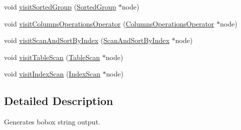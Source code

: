 \begin{DoxyCompactItemize}
void \hyperlink{class_bobox_plan_writing_physical_operator_visitor_a78d8526758ffeb3b335b8fc4a8a2defb}{visit\+Sorted\+Group} (\hyperlink{class_sorted_group}{Sorted\+Group} $\ast$node)
\item 
void \hyperlink{class_bobox_plan_writing_physical_operator_visitor_afe09e3f584a43ff5e06947918cf16a46}{visit\+Columns\+Operations\+Operator} (\hyperlink{class_columns_operations_operator}{Columns\+Operations\+Operator} $\ast$node)
\item 
void \hyperlink{class_bobox_plan_writing_physical_operator_visitor_a09cbea340b85723f8e66e50b466d6e68}{visit\+Scan\+And\+Sort\+By\+Index} (\hyperlink{class_scan_and_sort_by_index}{Scan\+And\+Sort\+By\+Index} $\ast$node)
\item 
void \hyperlink{class_bobox_plan_writing_physical_operator_visitor_aa8d995c39b2364625c1c10b6d7636b23}{visit\+Table\+Scan} (\hyperlink{class_table_scan}{Table\+Scan} $\ast$node)
\item 
void \hyperlink{class_bobox_plan_writing_physical_operator_visitor_ae042371767ff5d9296468da8037efa0f}{visit\+Index\+Scan} (\hyperlink{class_index_scan}{Index\+Scan} $\ast$node)
\end{DoxyCompactItemize}


\subsection{Detailed Description}
Generates bobox string output. 

